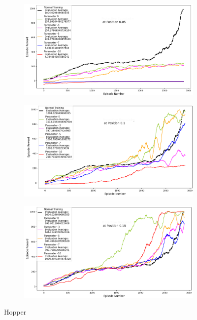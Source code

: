 \documentclass[journal]{IEEEtran}
\begin{document}
\begin{figure}
    \centering
    \begin{subfigure}[b]{0.5\textwidth}
      \centering
      \includegraphics[width=\textwidth]{Hopper_with_Boundary_at_0.05.png}
    \end{subfigure}
    \vspace*{0.0mm}
    \begin{subfigure}[b]{0.5\textwidth}
      \centering
      \includegraphics[width=\textwidth]{Hopper_with_Boundary_at_0.1.png}
    \end{subfigure}
    \vspace*{0.0mm}
    \begin{subfigure}[b]{0.5\textwidth}
      \centering
      \includegraphics[width=\textwidth]{Hopper_with_Boundary_at_0.15.png}
    \end{subfigure}
    \caption{Hopper}
    \label{fig:Hopper}
\end{figure}
\end{document}
